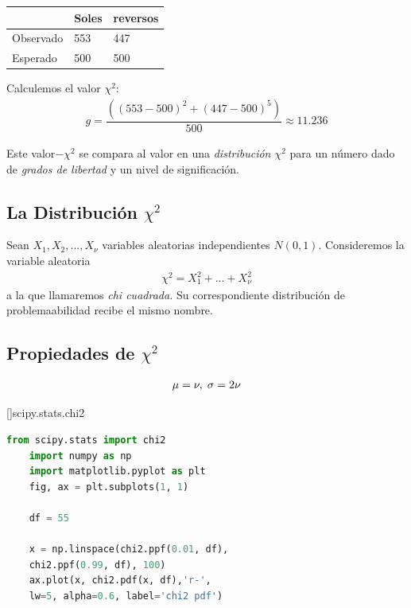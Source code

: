 \begin{center}
	\begin{tabular}{|l|l|l|}\hline
		& Soles & reversos\\\hline
		Observado & 553 & 447\\\hline
		Esperado & 500 & 500\\\hline
	\end{tabular}
\end{center}


Calculemos el valor $\chi^{2}:$
\begin{align}
	g = \dfrac{\left( \left( 553-500 \right)^{2}+\left( 447-500 \right)^{5} \right)}{500}\approx 11.236
\end{align}



Este valor$-\chi^{2}$ se compara al valor en una \emph{distribución $\chi^{2}$} para un número dado de \emph{grados de libertad} y un nivel de significación.

\subsection{La Distribución $\chi^{2}$}
Sean $X_{1},X_{2},...,X_{\nu}$ variables aleatorias independientes $N(0,1).$
Consideremos la variable aleatoria
\begin{align}
	\label{outline:19}
	\chi^{2}=X_{1}^{2}+...+X_{\nu}^{2}
\end{align}
a la que llamaremos \emph{chi cuadrada.} Su correspondiente distribución de problemaabilidad recibe el mismo nombre.

\subsection{Propiedades de $\chi^{2}$}
\begin{align}
	\label{eq:22}
	\mu=\nu, \; \sigma = 2\nu
\end{align}


[]{scipy.stats.chi2}
\begin{lstlisting}[language=Python]
	from scipy.stats import chi2
	import numpy as np
	import matplotlib.pyplot as plt
	fig, ax = plt.subplots(1, 1)
	
	df = 55
	
	x = np.linspace(chi2.ppf(0.01, df),
	chi2.ppf(0.99, df), 100)
	ax.plot(x, chi2.pdf(x, df),'r-',
	lw=5, alpha=0.6, label='chi2 pdf')
\end{lstlisting}



